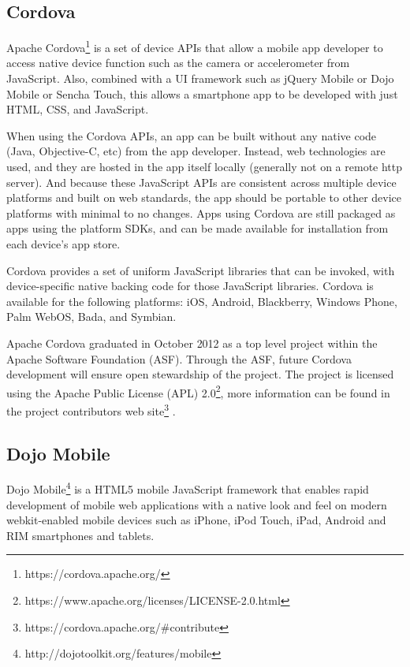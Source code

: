 \documentclass[a4paper,12pt]{book}
\begin{document}
\subsection{Cordova}
\label{Cordova} 

Apache Cordova\footnote{https://cordova.apache.org/} is a set of device APIs that allow a mobile app developer to access native device function such as the camera or accelerometer from JavaScript. Also, combined with a UI framework such as jQuery Mobile or Dojo Mobile or Sencha Touch, this allows a smartphone app to be developed with just HTML, CSS, and JavaScript.

When using the Cordova APIs, an app can be built without any native code (Java, Objective-C, etc) from the app developer. Instead, web technologies are used, and they are hosted in the app itself locally (generally not on a remote http server). And because these JavaScript APIs are consistent across multiple device platforms and built on web standards, the app should be portable to other device platforms with minimal to no changes.
Apps using Cordova are still packaged as apps using the platform SDKs, and can be made available for installation from each device's app store.

Cordova provides a set of uniform JavaScript libraries that can be invoked, with device-specific native backing code for those JavaScript libraries. Cordova is available for the following platforms: iOS, Android, Blackberry, Windows Phone, Palm WebOS, Bada, and Symbian.

Apache Cordova graduated in October 2012 as a top level project within the Apache Software Foundation (ASF). Through the ASF, future Cordova development will ensure open stewardship of the project. The project is licensed using the Apache Public License (APL) 2.0\footnote{https://www.apache.org/licenses/LICENSE-2.0.html}, more information can be found in the project contributors web site\footnote{https://cordova.apache.org/\#contribute} .

\subsection{Dojo Mobile}
\label{Dojo Mobile} 

Dojo Mobile\footnote{http://dojotoolkit.org/features/mobile}  is a HTML5 mobile JavaScript framework that enables rapid development of mobile web applications with a native look and feel on modern webkit-enabled mobile devices such as iPhone, iPod Touch, iPad, Android and RIM smartphones and tablets.
\end{document}
